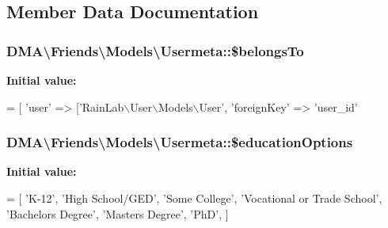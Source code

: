 \subsection{Member Data Documentation}
\hypertarget{classDMA_1_1Friends_1_1Models_1_1Usermeta_a93ae6777a48086374de412273d1d092e}{
\subsubsection[{\$belongs\+To}]{\setlength{\rightskip}{0pt plus 5cm}D\+M\+A\textbackslash{}\+Friends\textbackslash{}\+Models\textbackslash{}\+Usermeta\+::\$belongs\+To}}\label{classDMA_1_1Friends_1_1Models_1_1Usermeta_a93ae6777a48086374de412273d1d092e}
{\bfseries Initial value\+:}
\begin{DoxyCode}
= [
        \textcolor{stringliteral}{'user'}          => [\textcolor{stringliteral}{'RainLab\(\backslash\)User\(\backslash\)Models\(\backslash\)User'},
            \textcolor{stringliteral}{'foreignKey'}    => \textcolor{stringliteral}{'user\_id'}
\end{DoxyCode}
\hypertarget{classDMA_1_1Friends_1_1Models_1_1Usermeta_a6fcdae6bc041df0b3dba334953bb8f26}{
\subsubsection[{\$education\+Options}]{\setlength{\rightskip}{0pt plus 5cm}D\+M\+A\textbackslash{}\+Friends\textbackslash{}\+Models\textbackslash{}\+Usermeta\+::\$education\+Options\hspace{0.3cm}{\ttfamily [static]}}}\label{classDMA_1_1Friends_1_1Models_1_1Usermeta_a6fcdae6bc041df0b3dba334953bb8f26}
{\bfseries Initial value\+:}
\begin{DoxyCode}
= [
        \textcolor{stringliteral}{'K-12'},
        \textcolor{stringliteral}{'High School/GED'},
        \textcolor{stringliteral}{'Some College'},
        \textcolor{stringliteral}{'Vocational or Trade School'},
        \textcolor{stringliteral}{'Bachelors Degree'},
        \textcolor{stringliteral}{'Masters Degree'},
        \textcolor{stringliteral}{'PhD'},
    ]
\end{DoxyCode}
